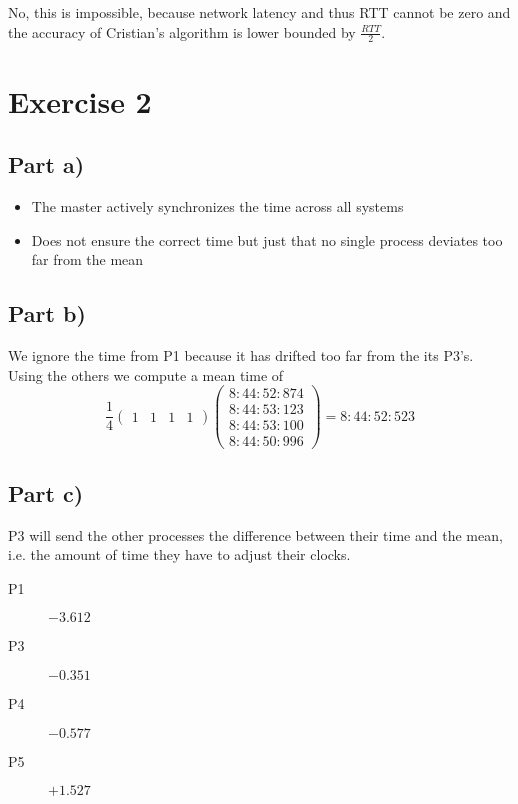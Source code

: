 \documentclass[10pt,a4paper]{article}
\begin{document}
No, this is impossible, because network latency and thus RTT cannot be zero and
the accuracy of Cristian's algorithm is lower bounded by $\frac{RTT}{2}$.

\section*{Exercise 2}

\subsection*{Part a)}

\begin{itemize}
\item The master actively synchronizes the time across all systems
\item Does not ensure the correct time but just that no single process deviates
  too far from the mean
\end{itemize}

\subsection*{Part b)}

We ignore the time from P1 because it has drifted too far from the its
P3's. Using the others we compute a mean time of
\begin{equation*}
  \frac{1}{4}
  \begin{pmatrix}
    1 & 1 & 1 & 1
  \end{pmatrix}
  \begin{pmatrix}
    8:44:52:874\\
    8:44:53:123\\
    8:44:53:100\\
    8:44:50:996
  \end{pmatrix}
  = 8:44:52:523
\end{equation*}

\subsection*{Part c)}

P3 will send the other processes the difference between their time and the mean,
i.e. the amount of time they have to adjust their clocks.
\begin{description}
\item[P1] $-3.612$
\item[P3] $-0.351$
\item[P4] $-0.577$
\item[P5] $+1.527$
\end{description}
\end{document}
